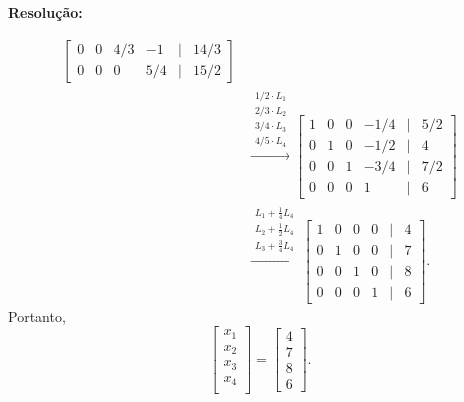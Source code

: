 \documentclass[leqno]{article}
\newenvironment{sol}
{
    \vspace{4mm}
    \noindent\textbf{Resolução:}
    \strut\newline
    \smallskip
    \hspace{-3.5mm}
}
{}
\begin{document}
\begin{enumerate}
\begin{sol}
\begin{align*}
\begin{bmatrix}
            0 & 0 & 4/3 & -1 & \mid & 14/3 \\
            0 & 0 & 0 & 5/4  & \mid & 15/2
        \end{bmatrix} \\
        & \xrightarrow{
            \begin{array}{l}
                1/2 \cdot L_{ 1 } \\
                2/3 \cdot L_{ 2 } \\
                3/4 \cdot L_{ 3 } \\
                4/5 \cdot L_{ 4 }
            \end{array}
        }
        \begin{bmatrix}
            1 & 0 & 0 & -1/4  & \mid & 5/2 \\
            0 & 1 & 0 & -1/2 & \mid & 4 \\
            0 & 0 & 1 & -3/4 & \mid & 7/2 \\
            0 & 0 & 0 & 1  & \mid & 6
        \end{bmatrix} \\
        & \xrightarrow{
            \begin{array}{l}
                L_{ 1 } + \frac{ 1 }{ 4 } L_{ 4 } \\
                L_{ 2 } + \frac{ 1 }{ 2 } L_{ 4 } \\
                L_{ 3 } + \frac{ 3 }{ 4 } L_{ 4 }
            \end{array}
        }
        \begin{bmatrix}
            1 & 0 & 0 & 0  & \mid & 4 \\
            0 & 1 & 0 & 0 & \mid & 7 \\
            0 & 0 & 1 & 0 & \mid & 8 \\
            0 & 0 & 0 & 1  & \mid & 6
        \end{bmatrix}
    .\end{align*}
    Portanto,
    \begin{equation*}
        \begin{bmatrix}
            x_{ 1 } \\
            x_{ 2 } \\
            x_{ 3 } \\
            x_{ 4 } \\
        \end{bmatrix}
        =
        \begin{bmatrix}
            4 \\
            7 \\
            8 \\
            6
        \end{bmatrix}
    .\end{equation*}
\end{sol} 


\end{enumerate}
\end{document}

